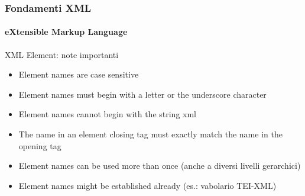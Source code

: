 \begin{frame}
    \frametitle{Fondamenti XML}
    \framesubtitle{eXtensible Markup Language}
    \addtocounter{nframe}{1}

	\begin{block}{XML Element: note importanti}
		\begin{itemize}
			\item Element names are case sensitive
			\item Element names must begin with a letter or the underscore character
			\item Element names cannot begin with the string xml
			\item The name in an element closing tag must exactly match the name in the opening tag
			\item Element names can be used more than once (anche a diversi livelli gerarchici)
			\item Element names might be established already (es.: vabolario TEI-XML)
		\end{itemize}
	\end{block}
\end{frame}







